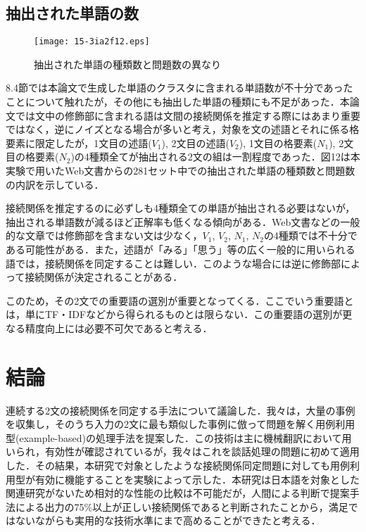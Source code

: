 \documentclass[japanese]{jnlp_1.4}
\begin{document}
\subsection{抽出された単語の数}

\begin{figure}[b]
\centerline{\texttt{[image: 15-3ia2f12.eps]}}
\caption{抽出された単語の種類数と問題数の異なり}
\end{figure}

8.4節では本論文で生成した単語のクラスタに含まれる単語数が不十分であったことについて触れたが，その他にも抽出した単語の種類にも不足があった．本論文では文中の修飾部に含まれる語は文間の接続関係を推定する際にはあまり重要ではなく，逆にノイズとなる場合が多いと考え，対象を文の述語とそれに係る格要素に限定したが，1文目の述語($V_{1}$), 2文目の述語($V_{2}$), 1文目の格要素($N_{1}$), 2文目の格要素($N_{2}$)の4種類全てが抽出される2文の組は一割程度であった．図12は本実験で用いたWeb文書からの281セット中での抽出された単語の種類数と問題数の内訳を示している．

接続関係を推定するのに必ずしも4種類全ての単語が抽出される必要はないが，抽出される単語数が減るほど正解率も低くなる傾向がある．Web文書などの一般的な文章では修飾部を含まない文は少なく，$V_{1}$, $V_{2}$, $N_{1}$, $N_{2}$の4種類では不十分である可能性がある．また，述語が「みる」「思う」等の広く一般的に用いられる語では，接続関係を同定することは難しい．このような場合には逆に修飾部によって接続関係が決定されることがある．

このため，その2文での重要語の選別が重要となってくる．ここでいう重要語とは，単にTF・IDFなどから得られるものとは限らない．この重要語の選別が更なる精度向上には必要不可欠であると考える．

\section{結論}

連続する2文の接続関係を同定する手法について議論した．我々は，大量の事例を収集し，そのうち入力の2文に最も類似した事例に倣って問題を解く用例利用型(example-based)の処理手法を提案した．この技術は主に機械翻訳において用いられ，有効性が確認されているが，我々はこれを談話処理の問題に初めて適用した．その結果，本研究で対象としたような接続関係同定問題に対しても用例利用型が有効に機能することを実験によって示した．本研究は日本語を対象とした関連研究がないため相対的な性能の比較は不可能だが，人間による判断で提案手法による出力の75{\%}以上が正しい接続関係であると判断されたことから，満足ではないながらも実用的な技術水準にまで高めることができたと考える．
\end{document}
